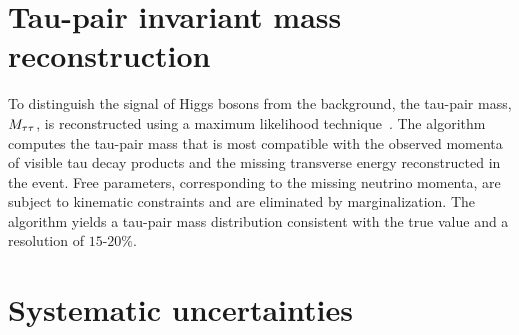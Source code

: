 \section{Tau-pair invariant mass reconstruction}

To distinguish the signal of Higgs bosons from the background, 
the tau-pair mass, $M_{\mathrm{\tau}\mathrm{\tau}}$, is reconstructed using a maximum likelihood technique~\cite{CMS-PAPER-HIG-10-002}. The algorithm computes the tau-pair mass that is most compatible with the observed momenta of visible tau decay products and the missing transverse energy reconstructed in the event. Free parameters, corresponding to the missing neutrino momenta, are subject to kinematic constraints and are eliminated by marginalization. The algorithm yields a tau-pair mass distribution consistent with the true value and a resolution of $15$-$20\%$.

\section{Systematic uncertainties}

